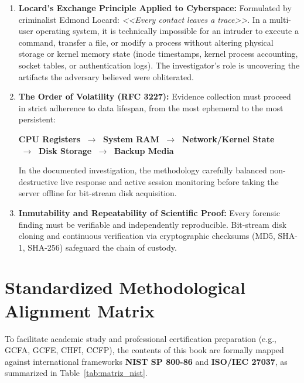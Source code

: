 \begin{enumerate}
    \item \textbf{Locard's Exchange Principle Applied to Cyberspace:}
    Formulated by criminalist Edmond Locard: \textit{<<Every contact leaves a trace>>}. In a multi-user operating system, it is technically impossible for an intruder to execute a command, transfer a file, or modify a process without altering physical storage or kernel memory state (inode timestamps, kernel process accounting, socket tables, or authentication logs). The investigator's role is uncovering the artifacts the adversary believed were obliterated.
    
    \item \textbf{The Order of Volatility (RFC 3227):}
    Evidence collection must proceed in strict adherence to data lifespan, from the most ephemeral to the most persistent:
    \begin{center}
    \small\sffamily
    \textbf{CPU Registers} $\;\longrightarrow\;$ \textbf{System RAM} $\;\longrightarrow\;$ \textbf{Network/Kernel State}\\[4pt]
    $\;\longrightarrow\;$ \textbf{Disk Storage} $\;\longrightarrow\;$ \textbf{Backup Media}
    \end{center}
    In the documented investigation, the methodology carefully balanced non-destructive live response and active session monitoring before taking the server offline for bit-stream disk acquisition.

    \item \textbf{Inmutability and Repeatability of Scientific Proof:}
    Every forensic finding must be verifiable and independently reproducible. Bit-stream disk cloning and continuous verification via cryptographic checksums (MD5, SHA-1, SHA-256) safeguard the chain of custody.
\end{enumerate}

\section*{Standardized Methodological Alignment Matrix}

To facilitate academic study and professional certification preparation (e.g., GCFA, GCFE, CHFI, CCFP), the contents of this book are formally mapped against international frameworks \textbf{NIST SP 800-86} and \textbf{ISO/IEC 27037}, as summarized in Table~\ref{tab:matriz_nist}.

